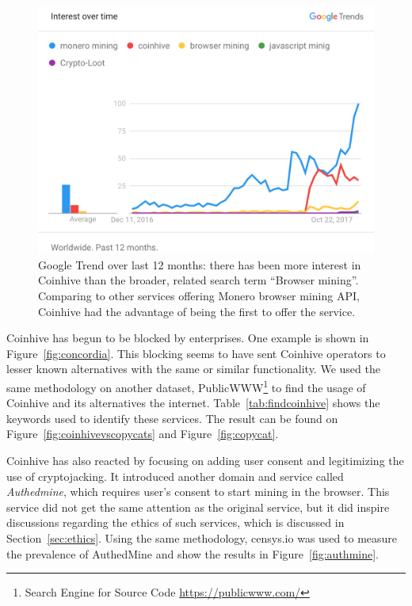 \begin{figure}[t]
\centering
\includegraphics[width=0.9\linewidth]{figures/usage_over_time2.png}
\caption{Google Trend over last 12 months: there has been more interest in Coinhive than the broader, related search term ``Browser mining''. Comparing to other services offering Monero browser mining API, Coinhive had the advantage of being the first to offer the service. \label{fig:trend}}
\end{figure}



Coinhive has begun to be blocked by enterprises. One example is shown in Figure~\ref{fig:concordia}. This blocking seems to have sent Coinhive operators to lesser known alternatives with the same or similar functionality. We used the same methodology on another dataset, PublicWWW\footnote{Search Engine for Source Code \url{https://publicwww.com/}} to find the usage of Coinhive and its alternatives the internet. Table~\ref{tab:findcoinhive} shows the keywords used to identify these services. The result can be found on Figure~\ref{fig:coinhivevscopycats} and Figure~\ref{fig:copycat}.

Coinhive has also reacted by focusing on adding user consent and legitimizing the use of cryptojacking. It introduced another domain and service called \textit{Authedmine}, which requires user's consent to start mining in the browser. This service did not get the same attention as the original service, but it did inspire discussions regarding the ethics of such services, which is discussed in Section~\ref{sec:ethics}. Using the same methodology, censys.io was used to measure the prevalence of AuthedMine and show the results in Figure~\ref{fig:authmine}. 

